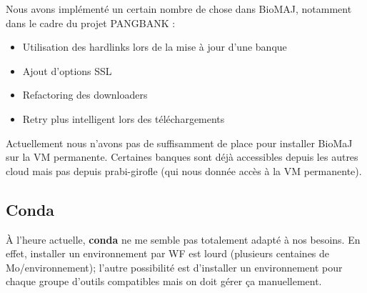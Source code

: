 Nous avons implémenté un certain nombre de chose dans BioMAJ, notamment dans le cadre du projet PANGBANK :
\begin{itemize}
    \item Utilisation des hardlinks lors de la mise à jour d'une banque
    \item Ajout d'options SSL
    \item Refactoring des downloaders
    \item Retry plus intelligent lors des téléchargements
\end{itemize}
Actuellement nous n'avons pas de suffisamment de place pour installer BioMaJ sur la VM permanente. Certaines banques sont déjà accessibles depuis les autres cloud mais pas depuis prabi-girofle (qui nous donnée accès à la VM permanente).

\subsection{Conda}
À l'heure actuelle, \textbf{conda} ne me semble pas totalement adapté à nos besoins. En effet, installer un environnement par WF est lourd (plusieurs centaines de Mo/environnement); l'autre possibilité est d'installer un environnement pour chaque groupe d'outils compatibles mais on doit gérer ça manuellement.
